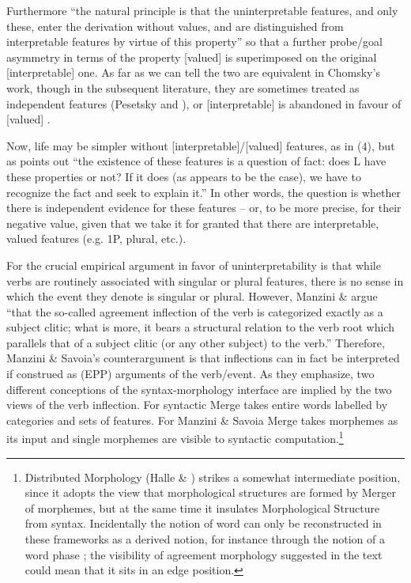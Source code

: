 \documentclass[output=paper]{langsci/langscibook}
\begin{document}
Furthermore “the natural principle is that the uninterpretable features, and only these, enter the derivation without values, and are distinguished from interpretable features by virtue of this property” so that a further probe/goal asymmetry in terms of the property [valued] is superimposed on the original [interpretable] one. As far as we can tell the two are equivalent in Chomsky’s work, though in the subsequent literature, they are sometimes treated as independent features (Pesetsky and \citealt{Torrego2007}), or [interpretable] is abandoned in favour of [valued] \citep{Preminger2014}. 

 Now, life may be simpler without [interpretable]/[valued] features, as in (4), but as \citet[4]{Chomsky2001} points out “the existence of these features is a question of fact: does L have these properties or not? If it does (as appears to be the case), we have to recognize the fact and seek to explain it.” In other words, the question is whether there is independent evidence for these features – or, to be more precise, for their negative value, given that we take it for granted that there are interpretable, valued features (e.g. 1P, plural, etc.).

For \citet{Chomsky1995} the crucial empirical argument in favor of uninterpretability is that while verbs are routinely associated with singular or plural features, there is no sense in which the event they denote is singular or plural. However, Manzini \& \citet[21]{Savoia2007} argue “that the so-called agreement inflection of the verb is categorized exactly as a subject clitic; what is more, it bears a structural relation to the verb root which parallels that of a subject clitic (or any other subject) to the verb.” Therefore, Manzini \& Savoia’s counterargument is that inflections can in fact be interpreted if construed as (EPP) arguments of the verb/event. As they emphasize, two different conceptions of the syntax-morphology interface are implied by the two views of the verb inflection. For \citet{Chomsky1995} syntactic Merge takes entire words labelled by categories and sets of features. For Manzini \& Savoia Merge takes morphemes as its input and single morphemes are visible to syntactic computation.\footnote{Distributed Morphology (Halle \& \citealt{Marantz1993}) strikes a somewhat intermediate position, since it adopts the view that morphological structures are formed by Merger of morphemes, but at the same time it insulates Morphological Structure from syntax. Incidentally the notion of word can only be reconstructed in these frameworks as a derived notion, for instance through the notion of a word phase \citep{Marantz2007}; the visibility of agreement morphology suggested in the text could mean that it sits in an edge position.} 
\end{document}
